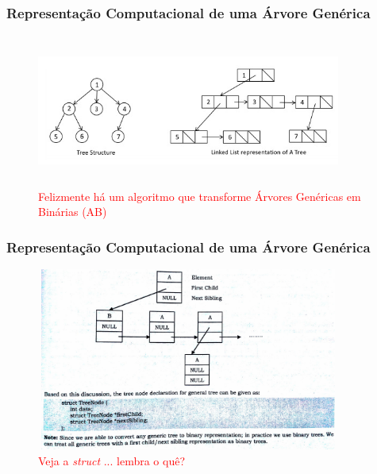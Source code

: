 
\begin{frame}

    \frametitle{Representação  Computacional de uma Árvore Genérica}
    
     \begin{figure}[!ht]
     \centering
    \includegraphics[width=10cm, height=5cm]{figs/fig_arvores/arv_generica03.jpg}
    \caption{\textcolor{red}{Felizmente há um algoritmo que transforme  Árvores Genéricas em Binárias (AB) }}
    \end{figure}

\end{frame}

\begin{frame}

    \frametitle{Representação  Computacional de uma Árvore Genérica}
    
     \begin{figure}[!ht]
     \centering
    \includegraphics[width=10cm, height=6cm]{figs/fig_arvores/arv_generica04.jpg}
   \caption{\textcolor{red}{Veja a \textit{struct} ... lembra o quê?}}
    \end{figure}

\end{frame}

